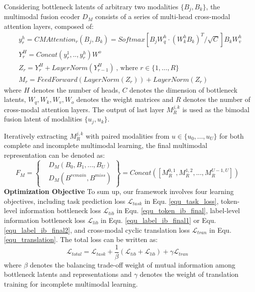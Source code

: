 \documentclass{article}
\begin{document}
Considering bottleneck latents of arbitrary two modalities $\{B_j,B_k\}$, the multimodal fusion ecoder $D_M$ consists of a series of multi-head cross-modal attention layers, composed of:
\begin{equation}
\begin{aligned}
&y_r^h=CMAttention_r(B_j,B_k)=Softmax\left[B_jW^h_q\cdot (W^h_kB_k)^T/\sqrt{C} \right]B_kW^h_v \\
&Y_r^H=Concat(y_r^1,..,y_r^h)W^o \\
&Z_{r}=Y^H_r+LayerNorm(Y^H_{r-1})\ \text{, where } r\in\{1,...,R\} \\
&M_{r}=FeedForward(LayerNorm(Z_{r}))+LayerNorm(Z_{r})
\end{aligned}
\end{equation}
where $H$ denotes the number of heads, $C$ denotes the dimension of bottleneck latents, $W_q,W_k,W_v,W_o$ denotes the weight matrices and $R$ denotes the number of cross-modal attention layers. The output of last layer $M^{j,k}_{R}$ is used as the bimodal fusion latent of modalities $\{u_j,u_k\}$. 

Iteratively extracting $M^{j,k}_{R}$ with paired modalities from $u\in\{u_0,...,u_U\}$ for both complete and incomplete multimodal learning, the final multimodal representation can be denoted as:
\begin{equation}
F_M=\left\{
\begin{aligned}
&D_M(B_0,B_1,...,B_U)\\
&D_M(B^{remain},B^{miss})
\end{aligned}
\right\}=Concat([M^{0,1}_{R},M^{1,2}_{R},...,M^{U-1,U}_{R}])
\end{equation}
\textbf{Optimization Objective} To sum up, our framework involves four learning objectives, including task prediction loss $\mathcal{L}_{task}$ in Equ. \ref{equ_task_loss}, token-level information bottleneck loss $\mathcal{L}_{tib}$ in Equ. \ref{equ_token_ib_final}, label-level information bottleneck loss $\mathcal{L}_{lib}$ in Equ. \ref{equ_label_ib_final1} or Equ. \ref{equ_label_ib_final2}, and cross-modal cyclic translation loss $\mathcal{L}_{tran}$ in Equ. \ref{equ_translation}. The total loss can be written as:
\begin{equation}
\mathcal{L}_{total}=\mathcal{L}_{task}+\frac{1}{\beta}(\mathcal{L}_{tib}+\mathcal{L}_{lib})+\gamma \mathcal{L}_{tran}
\label{equ_loss_total}
\end{equation}
where $\beta$ denotes the balancing trade-off weight of mutual information among bottleneck latents and representations and $\gamma$ denotes the weight of translation training for incomplete multimodal learning. %
\end{document}
